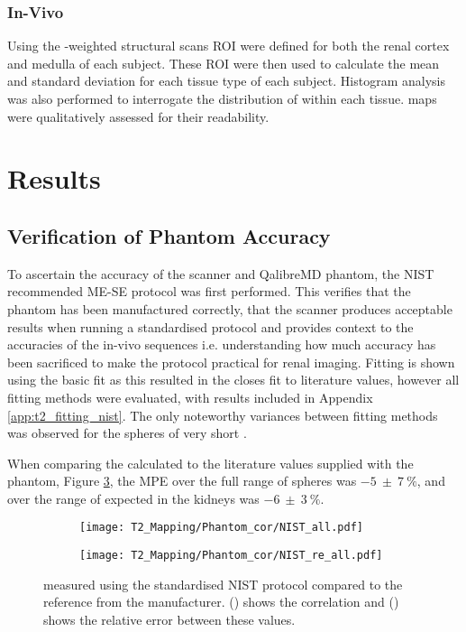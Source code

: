 \subsubsection{In-Vivo}

Using the \tone-weighted structural scans \ac{ROI} were defined for both the renal cortex and medulla of each subject. These \ac{ROI} were then used to calculate the mean and standard deviation \ttwo for each tissue type of each subject. Histogram analysis was also performed to interrogate the distribution of \ttwo within each tissue. \ttwo maps were qualitatively assessed for their readability.

\newpage

\section{Results}

\subsection{Verification of Phantom Accuracy}
To ascertain the accuracy of the scanner and QalibreMD phantom, the \ac{NIST} recommended ME-SE protocol was first performed. This verifies that the phantom has been manufactured correctly, that the scanner produces acceptable results when running a standardised protocol and provides context to the accuracies of the in-vivo sequences i.e. understanding how much accuracy has been sacrificed to make the protocol practical for renal imaging. Fitting is shown using the basic fit as this resulted in the closes fit to literature values, however all fitting methods were evaluated, with results included in Appendix \ref{app:t2_fitting_nist}. The only noteworthy variances between fitting methods was observed for the spheres of very short \ttwo.

When comparing the \ttwo calculated to the literature values supplied with the phantom, Figure \ref{fig:t2_nist}, the \ac{MPE} over the full range of spheres was $-5~\pm~7~\%$, and over the range of \ttwo expected in the kidneys was $-6~\pm~3~\%$. 

\begin{figure}[H]
	\centering
	\begin{subfigure}[c]{0.47\textwidth}
		\centering
		\texttt{[image: T2\_Mapping/Phantom\_cor/NIST\_all.pdf]}
		\caption{}
		\label{fig:t2_nist_cor}
	\end{subfigure}
	\hfill
	\begin{subfigure}[c]{0.47\textwidth}
		\centering
		\texttt{[image: T2\_Mapping/Phantom\_cor/NIST\_re\_all.pdf]}
		\caption{}
		\label{fig:t2_nist_re}
	\end{subfigure}
	\caption{\ttwo measured using the standardised \ac{NIST} protocol compared to the reference \ttwo from the manufacturer. () shows the correlation and () shows the relative error between these values.}
	\label{fig:t2_nist}
\end{figure}
